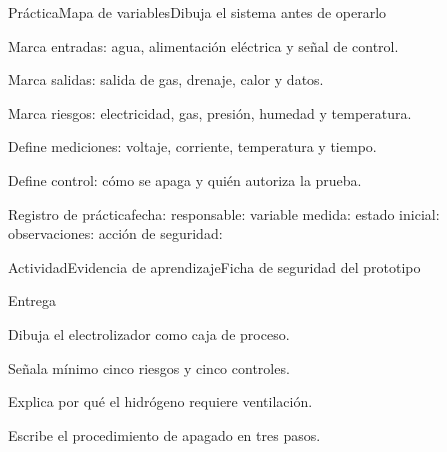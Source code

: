 \documentclass{../plantilla/hvtbook}
\begin{document}
\begin{HVTPage}{Práctica}{Mapa de variables}{Dibuja el sistema antes de operarlo}
\begin{HVTSteps}\item Marca entradas: agua, alimentación eléctrica y señal de control. \item Marca salidas: salida de gas, drenaje, calor y datos. \item Marca riesgos: electricidad, gas, presión, humedad y temperatura. \item Define mediciones: voltaje, corriente, temperatura y tiempo. \item Define control: cómo se apaga y quién autoriza la prueba.\end{HVTSteps}
\begin{HVTCode}{Registro de práctica}fecha:
responsable:
variable medida:
estado inicial:
observaciones:
acción de seguridad:\end{HVTCode}
\end{HVTPage}
\begin{HVTPage}{Actividad}{Evidencia de aprendizaje}{Ficha de seguridad del prototipo}
\begin{HVTTask}{Entrega}\item Dibuja el electrolizador como caja de proceso. \item Señala mínimo cinco riesgos y cinco controles. \item Explica por qué el hidrógeno requiere ventilación. \item Escribe el procedimiento de apagado en tres pasos.\end{HVTTask}
\end{HVTPage}
\end{document}
